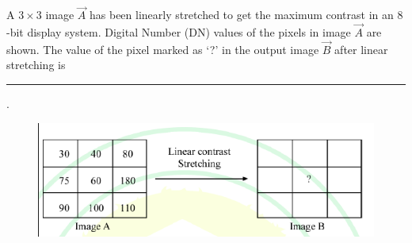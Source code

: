 \item A $3 \times 3$ image $\vec{A}$ has been linearly stretched to get the maximum contrast in an $8$-bit display system. Digital Number (DN) values of the pixels in image $\vec{A}$ are shown. The value of the pixel marked as `?' in the output image $\vec{B}$ after linear stretching is \rule{1cm}{0.01pt}. 
\hfill{}
\begin{figure}[H]
    \centering
    \includegraphics[width=0.7\columnwidth]{GATE/2025/GG1/figs/fig12.png}
    \caption{}
    \label{fig:q63}
\end{figure}

